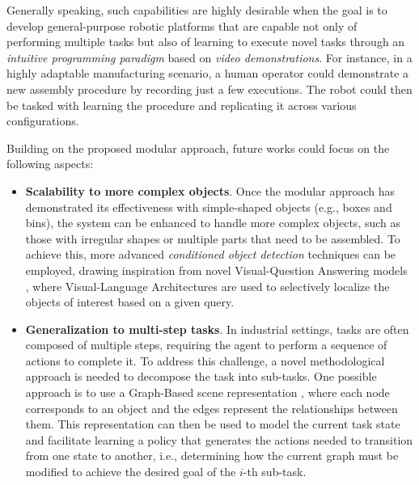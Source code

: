 Generally speaking, such capabilities are highly desirable when the goal is to develop general-purpose robotic platforms that are capable not only of performing multiple tasks but also of learning to execute novel tasks through an \textit{intuitive programming paradigm} based on \textit{video demonstrations}. For instance, in a highly adaptable manufacturing scenario, a human operator could demonstrate a new assembly procedure by recording just a few executions. The robot could then be tasked with learning the procedure and replicating it across various configurations.

Building on the proposed modular approach, future works could focus on the following aspects:
\begin{itemize}
    \item \textbf{Scalability to more complex objects}. Once the modular approach has demonstrated its effectiveness with simple-shaped objects (e.g., boxes and bins), the system can be enhanced to handle more complex objects, such as those with irregular shapes or multiple parts that need to be assembled. To achieve this, more advanced \textit{conditioned object detection} techniques can be employed, drawing inspiration from novel Visual-Question Answering models \cite{wen2024object}, where Visual-Language Architectures are used to selectively localize the objects of interest based on a given query. 

    \item \textbf{Generalization to multi-step tasks}. In industrial settings, tasks are often composed of multiple steps, requiring the agent to perform a sequence of actions to complete it. To address this challenge, a novel methodological approach is needed to decompose the task into sub-tasks. One possible approach is to use a Graph-Based scene representation \cite{di2023one}, where each node corresponds to an object and the edges represent the relationships between them. This representation can then be used to model the current task state and facilitate learning a policy that generates the actions needed to transition from one state to another, i.e., determining how the current graph must be modified to achieve the desired goal of the $i$-th sub-task. 
\end{itemize}




